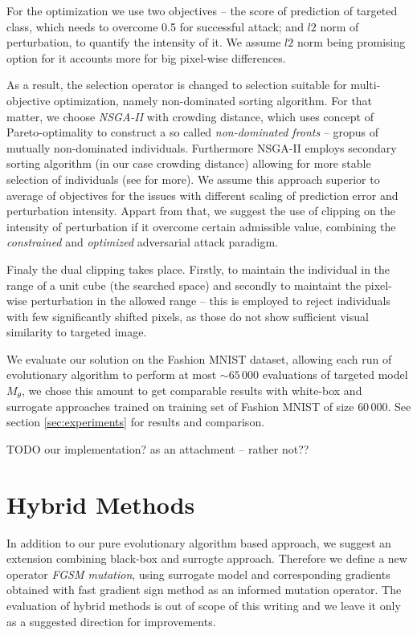 For the optimization we use two objectives -- the score of prediction of targeted class, which needs to overcome 0.5 for successful attack; and $l2$ norm of perturbation, to quantify the intensity of it. We assume $l2$ norm being promising option for it accounts more for big pixel-wise differences.

As a result, the selection operator is changed to selection suitable for multi-objective optimization, namely non-dominated sorting algorithm. For that matter, we choose \emph{NSGA-II} with crowding distance, which uses concept of Pareto-optimality to construct a so called \emph{non-dominated fronts} -- gropus of mutually non-dominated individuals. Furthermore NSGA-II employs secondary sorting algorithm (in our case crowding distance) allowing for more stable selection of individuals (see \cite{nsga} for more). We assume this approach superior to average of objectives for the issues with different scaling of prediction error and perturbation intensity. Appart from that, we suggest the use of clipping on the intensity of perturbation if it overcome certain admissible value, combining the \emph{constrained} and \emph{optimized} adversarial attack paradigm.

Finaly the dual clipping takes place. Firstly, to maintain the individual in the range of a unit cube (the searched space) and secondly to maintaint the pixel-wise perturbation in the allowed range -- this is employed to reject individuals with few significantly shifted pixels, as those do not show sufficient visual similarity to targeted image.

We evaluate our solution on the Fashion MNIST dataset, allowing each run of evolutionary algorithm to perform at most $\sim 65\,000$ evaluations of targeted model $M_\theta$, we chose this amount to get comparable results with white-box and surrogate approaches trained on training set of Fashion MNIST of size $60\,000$. See section \ref{sec:experiments} for results and comparison.

TODO our implementation? as an attachment -- rather not??

\section{Hybrid Methods}
\label{sec:hm}
In addition to our pure evolutionary algorithm based approach, we suggest an extension combining black-box and surrogte approach. Therefore we define a new operator \emph{FGSM mutation}, using surrogate model and corresponding gradients obtained with fast gradient sign method as an informed mutation operator. The evaluation of hybrid methods is out of scope of this writing and we leave it only as a suggested direction for improvements.

